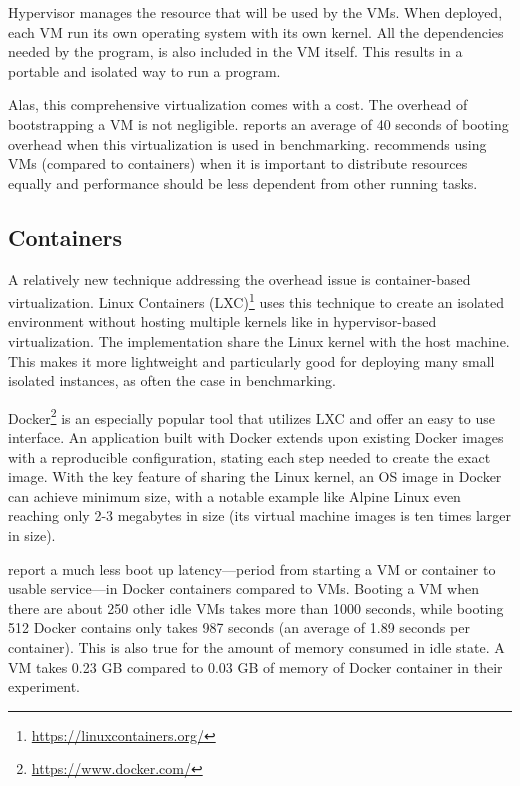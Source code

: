Hypervisor manages the resource that will be used by the VMs.
When deployed, each VM run its own operating system with its own kernel.
All the dependencies needed by the program, is also included in the VM itself.
This results in a portable and isolated way to run a program.

Alas, this comprehensive virtualization comes with a cost.
The overhead of bootstrapping a VM is not negligible.
\citet{kordonBenchKitToolMassive2014} reports an average of 40 seconds of booting overhead when this virtualization is used in benchmarking.
\citet{scheepersVirtualizationContainerizationApplication2014} recommends using VMs (compared to containers) when it is important to distribute resources equally and performance should be less dependent from other running tasks.

\subsection{Containers}

A relatively new technique addressing the overhead issue is container-based virtualization.
Linux Containers (LXC)\footnote{\href{https://linuxcontainers.org/}{https://linuxcontainers.org/}} uses this technique to create an isolated environment without hosting multiple kernels like in hypervisor-based virtualization.
The implementation share the Linux kernel with the host machine.
This makes it more lightweight and particularly good for deploying many small isolated instances, as often the case in benchmarking.

Docker\footnote{\href{https://www.docker.com/}{https://www.docker.com/}} is an especially popular tool that utilizes LXC and offer an easy to use interface.
An application built with Docker extends upon existing Docker images with a reproducible  configuration, stating each step needed to create the exact image.
With the key feature of sharing the Linux kernel, an OS image in Docker can achieve minimum size, with a notable example like Alpine Linux even reaching only 2-3 megabytes in size (its virtual machine images is ten times larger in size).

\citet{zhangComparativeStudyContainers2018} report a much less boot up latency---period from starting a VM or container to usable service---in Docker containers compared to VMs.
Booting a VM when there are about 250 other idle VMs takes more than 1000 seconds, while booting 512 Docker contains only takes 987 seconds (an average of 1.89 seconds per container).
This is also true for the amount of memory consumed in idle state.
A VM takes 0.23 GB compared to 0.03 GB of memory of Docker container in their experiment.

